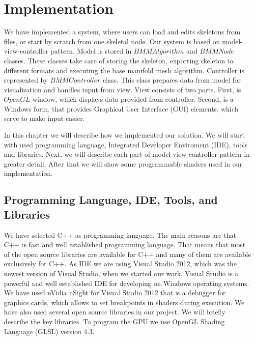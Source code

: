 \chapter{Implementation}

We have implemented a system, where users can load and edits skeletons from files, or start by scratch from one skeletal node.
Our system is based on model-view-controller pattern.
Model is stored in $BMMAlgorithm$ and $BMMNode$ classes.
These classes take care of storing the skeleton, exporting skeleton to different formats and executing the base manifold mesh algorithm.
Controller is represented by $BMMController$ class.
This class prepares data from model for visualization and handles input from view.
View consists of two parts.
First, is $OpenGL$ window, which displays data provided from controller.
Second, is a Windows form, that provides Graphical User Interface (GUI) elements, which serve to make input easier.

In this chapter we will describe how we implemented our solution.
We will start with used programming language, Integrated Developer Enviroment (IDE), tools and libraries.
Next, we will describe each part of model-view-controller pattern in greater detail.
After that we will show some programmable shaders used in our implementation.

\section{Programming Language, IDE, Tools, and Libraries}

We have selected C++ as programming language.
The main reasons are that C++ is fast and well established programming language.
That means that most of the open source libraries are available for C++ and many of them are available exclusively for C++.
As IDE we are using Visual Studio 2012, which was the newest version of Visual Studio, when we started our work.
Visual Studio is a powerful and well established IDE for developing on Windows operating systems.
We have used nVidia nSight for Visual Studio 2012 that is a debugger for graphics cards, which allows to set breakpoints in shaders during execution. We have also used several open source libraries in our project. We will briefly describe the key libraries.
To program the GPU we use OpenGL Shading Language (GLSL) version 4.3.

